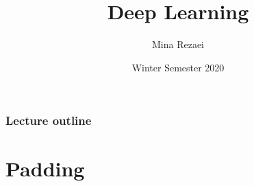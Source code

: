 \documentclass[11pt,compress,t,notes=noshow]{beamer}
\title{Deep Learning}
\author{Mina Rezaei}
\institute{Department of Statistics -- LMU Munich}
\date{Winter Semester 2020}
\begin{document}
    






\begin{frame}
\frametitle{Lecture outline}
\tableofcontents
\end{frame}
\section{Padding}
\end{document}
